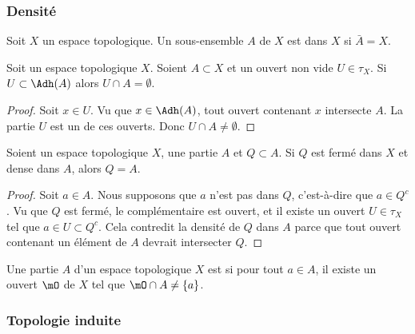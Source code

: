 \subsubsection{Densité}


\begin{definition}\label{DefEnsembleDense}
	Soit \( X \) un espace topologique. Un sous-ensemble \( A \) de \( X \) est  dans \( X \) si \( \bar A = X\).
\end{definition}


\begin{lemma}	\label{LEMooITBVooBUYpve}
	Soit un espace topologique \( X\). Soient \( A\subset X\) et un ouvert non vide \( U\in\tau_X\). Si \( U\subset\Adh(A)\) alors \( U\cap A=\emptyset\).
\end{lemma}

\begin{proof}
	Soit \( x\in U\). Vu que \( x\in\Adh(A)\), tout ouvert contenant \( x\) intersecte \( A\). La partie \( U\) est un de ces ouverts. Donc \( U\cap A\neq\emptyset\).
\end{proof}

\begin{proposition}	\label{PROPooTKHVooMderxm}
	Soient un espace topologique \( X\), une partie \( A\) et \( Q\subset A\). Si \( Q\) est fermé dans \( X\) et dense dans \( A\), alors \( Q=A\).
\end{proposition}

\begin{proof}
	Soit \( a\in A\). Nous supposons que \( a\) n'est pas dans \( Q\), c'est-à-dire que \( a\in Q^c\). Vu que \( Q\) est fermé, le complémentaire est ouvert, et il existe un ouvert \( U\in\tau_X\) tel que \( a\in U\subset Q^c\). Cela contredit la densité de \( Q\) dans \( A\) parce que tout ouvert contenant un élément de \( A\) devrait intersecter \( Q\).
\end{proof}


\begin{definition}	\label{DEFooQUNJooWZasqV}
	Une partie \( A\) d'un espace topologique \( X\) est  si pour tout \( a\in A\), il existe un ouvert \( \mO\) de \( X\) tel que \( \mO\cap A\neq \{ a \}\).
\end{definition}


\subsubsection{Topologie induite}

